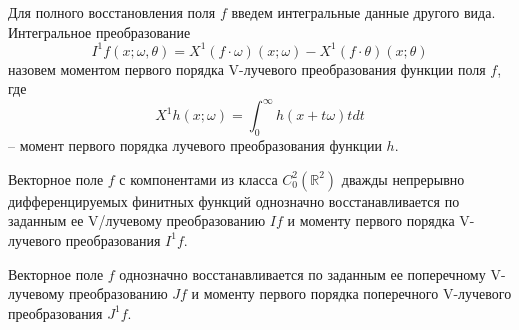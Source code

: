 Для полного восстановления поля $f$ введем интегральные данные другого вида.
Интегральное преобразование 
$$I^1 f(x;\omega,\theta)=X^1 (f\cdot\omega)(x;\omega)-X^1 (f\cdot\theta)(x;\theta)$$
назовем моментом первого порядка V-лучевого преобразования функции поля $f$, где
$$X^1 h(x;\omega)=\int_0^\infty h(x+t\omega )tdt$$
-- момент первого порядка лучевого преобразования функции $h$.

\begin{theorem} Векторное поле $f$ с компонентами из класса $C_0^2 (\mathbb R^2 )$ дважды непрерывно дифференцируемых финитных функций однозначно восстанавливается по заданным ее V\-/лучевому преобразованию $If$ и моменту первого порядка V-лучевого преобразования $I^1 f$.
\end{theorem}

\begin{theorem} Векторное поле $f$ однозначно восстанавливается по заданным ее поперечному V-лучевому преобразованию $Jf$ и моменту первого порядка поперечного V-лучевого преобразования $J^1 f$.
\end{theorem}




%
%
%

